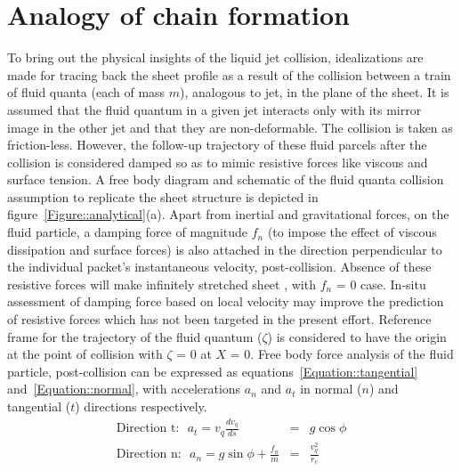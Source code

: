 \documentclass[%
 aip,
 sd,%
amsmath,amssymb,
preprint,%
author-year,%
]{revtex4-1}
\begin{document}
\section{Analogy of chain formation}	
To bring out the physical insights of the liquid jet collision, idealizations are made for tracing back the sheet profile as a result of the collision between a train of fluid quanta (each of mass $m$), analogous to jet, in the plane of the sheet. It is assumed that the fluid quantum in a given jet interacts only with its mirror image in the other jet and that they are non-deformable. The collision is taken as friction-less. However, the follow-up trajectory of these fluid parcels after the collision is considered damped so as to mimic resistive forces like viscous and surface tension. A free body diagram and schematic of the fluid quanta collision assumption to replicate the sheet structure is depicted in figure~\ref{Figure::analytical}(a). Apart from inertial and gravitational forces, on the fluid particle, a damping force of magnitude $f_n$ (to impose the effect of viscous dissipation and surface forces) is also attached in the direction perpendicular to the individual packet's instantaneous velocity, post-collision. Absence of these resistive forces will make infinitely stretched sheet \citep{taylor1960formation}, with $f_n$ = 0 case. In-situ assessment of damping force based on local velocity may improve the prediction of resistive forces which has not been targeted in the present effort. Reference frame for the trajectory of the fluid quantum ($\zeta$) is considered to have the origin at the point of collision with $\zeta$ = 0 at $X$ = 0. Free body force analysis of the fluid particle, post-collision can be expressed as equations~\ref{Equation::tangential} and~\ref{Equation::normal}, with accelerations $a_n$ and $a_t$ in normal ($n$) and tangential ($t$) directions respectively.
\begin{subequations}%
	\label{Equation::forceBal}	
	\begin{eqnarray}
	\label{Equation::tangential}
	\text{Direction t:}\:\:\: a_t = v_{q}\frac{dv_{q}}{ds} &=& g\cos\phi\\
	\label{Equation::normal}
	\text{Direction n:}\:\:\: a_n = g\sin\phi + \frac{f_n}{m} &=& \frac{v_{q}^2}{r_c}
	\end{eqnarray}
\end{subequations}
\end{document}
